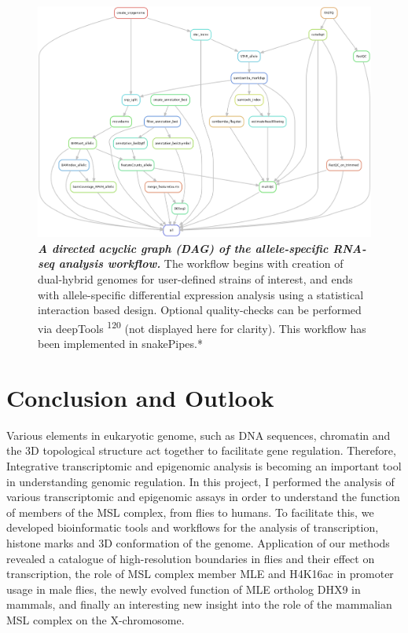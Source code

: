 \documentclass[11pt,twoside]{MPIthesis}
\theoremstyle{definition}
\theoremstyle{definition}
\theoremstyle{definition}
\theoremstyle{remark}
\begin{document}
\clearpage
\begin{figure}

{\centering \includegraphics[width=0.95\linewidth,height=0.5\textheight]{figures/results_fig8} 

}

\caption[A directed acyclic graph (DAG) of the allele-specific RNA-seq analysis workflow]{\emph{\textbf{A directed acyclic graph (DAG) of the
allele-specific RNA-seq analysis workflow.} }The workflow begins with
creation of dual-hybrid genomes for user-defined strains of interest,
and ends with allele-specific differential expression analysis using a
statistical interaction based design. Optional quality-checks can be
performed via deepTools \textsuperscript{120} (not displayed here for
clarity). This workflow has been implemented in snakePipes.*}\label{fig:unnamed-chunk-13}
\end{figure}








\section{Conclusion and Outlook}\label{conclusion-and-outlook}

Various elements in eukaryotic genome, such as DNA sequences, chromatin
and the 3D topological structure act together to facilitate gene
regulation. Therefore, Integrative transcriptomic and epigenomic
analysis is becoming an important tool in understanding genomic
regulation. In this project, I performed the analysis of various
transcriptomic and epigenomic assays in order to understand the function
of members of the MSL complex, from flies to humans. To facilitate this,
we developed bioinformatic tools and workflows for the analysis of
transcription, histone marks and 3D conformation of the genome.
Application of our methods revealed a catalogue of high-resolution
boundaries in flies and their effect on transcription, the role of MSL
complex member MLE and H4K16ac in promoter usage in male flies, the
newly evolved function of MLE ortholog DHX9 in mammals, and finally an
interesting new insight into the role of the mammalian MSL complex on
the X-chromosome.
\end{document}
